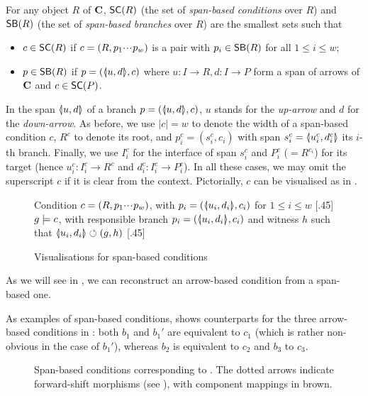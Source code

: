 \begin{definition}
  For any object $R$ of $\mathbf{C}$, $\SC R$ (the set of \emph{span-based conditions} over $R$) and $\SB R$ (the set of \emph{span-based branches} over $R$) are the smallest sets such that
  \begin{itemize}
  \item $c\in \SC R$ if $c=(R,p_1{\cdotp\mkern-2mu\cdotp\mkern-2mu\cdotp\mkern1mu} p_w)$ is a pair with $p_i\in \SB R$ for all $1\leq i\leq w$;
  \item $p\in \SB R$ if $p=(\spanof u d,c)$ where $u: I\to R, d:I\to P$ form a span of arrows of $\mathbf{C}$ and $c\in \SC P$.
  \end{itemize}
\end{definition}
%
In the span $\spanof u d$ of a branch $p=(\spanof u d,c)$, $u$ stands for the \emph{up-arrow} and $d$ for the \emph{down-arrow}. As before, we use $|c|=w$ to denote the width of a span-based condition $c$, $R^c$ to denote its root, and $p^c_i=(s^c_i,c_i)$ with span $s^c_i=\spanof{u^c_i}{d^c_i}$ its $i$-th branch. Finally, we use $I^c_i$ for the interface of span $s^c_i$ and $P^c_i$ ($=R^{c_i}$) for its target (hence $u^c_i:I^c_i\to R^c$ and $d^c_i:I^c_i\rightarrow P^c_i$). In all these cases, we may omit the superscript $c$ if it is clear from the context. Pictorially, $c$ can be visualised as in .
%
\begin{figure}[t]
\centering
\subcaptionbox
  {Condition $c=(R,p_1{\cdotp\mkern-2mu\cdotp\mkern-2mu\cdotp\mkern1mu} p_w)$, with $p_i=(\spanof{u_i}{d_i},c_i)$ for $1\leq i\leq w$
   }
  [.45\textwidth]
  {}
\qquad
\subcaptionbox
  {$g\models c$, with responsible branch $p_i=(\spanof{u_i}{d_i},c_i)$ and witness $h$ such that $\spanof{u_i}{d_i}\commutes (g,h)$
   }
  [.45\textwidth]
  {}
\vspace*{-2mm}
\caption{Visualisations for span-based conditions}
\end{figure}
%
As we will see in , we can reconstruct an arrow-based condition from a span-based one.

As examples of span-based conditions,  shows counterparts for the three arrow-based conditions in : both $b_1$ and $b_1'$ are equivalent to $c_1$ (which is rather non-obvious in the case of $b_1'$), whereas $b_2$ is equivalent to $c_2$ and $b_3$ to $c_3$.

\begin{figure}[t]
\centering

\vspace*{-5mm}
\caption{Span-based conditions corresponding to . The dotted arrows indicate forward-shift morphisms (see ), with component mappings in brown.}
\end{figure}

